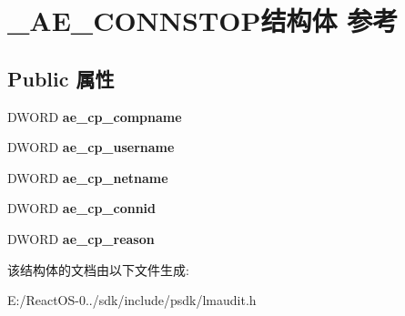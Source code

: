 \hypertarget{struct___a_e___c_o_n_n_s_t_o_p}{}\section{\+\_\+\+A\+E\+\_\+\+C\+O\+N\+N\+S\+T\+O\+P结构体 参考}
\label{struct___a_e___c_o_n_n_s_t_o_p}
\subsection*{Public 属性}
\begin{DoxyCompactItemize}
\item 
\mbox{\label{struct___a_e___c_o_n_n_s_t_o_p_af0ea5ad3bbc165c5a1c9556abb5f5d47}} 
D\+W\+O\+RD {\bfseries ae\+\_\+cp\+\_\+compname}
\item 
\mbox{\label{struct___a_e___c_o_n_n_s_t_o_p_a43ffa421f4536a86ca2a7460f2ab9db1}} 
D\+W\+O\+RD {\bfseries ae\+\_\+cp\+\_\+username}
\item 
\mbox{\label{struct___a_e___c_o_n_n_s_t_o_p_a2cbf9e806aff42429ada63745cbdf8a5}} 
D\+W\+O\+RD {\bfseries ae\+\_\+cp\+\_\+netname}
\item 
\mbox{\label{struct___a_e___c_o_n_n_s_t_o_p_afe0059783063ae93e89e66b872eda58d}} 
D\+W\+O\+RD {\bfseries ae\+\_\+cp\+\_\+connid}
\item 
\mbox{\label{struct___a_e___c_o_n_n_s_t_o_p_abc8ad3c82352d725e62ca68b4bf1b604}} 
D\+W\+O\+RD {\bfseries ae\+\_\+cp\+\_\+reason}
\end{DoxyCompactItemize}


该结构体的文档由以下文件生成\+:\begin{DoxyCompactItemize}
\item 
E\+:/\+React\+O\+S-\/0../sdk/include/psdk/lmaudit.\+h\end{DoxyCompactItemize}
